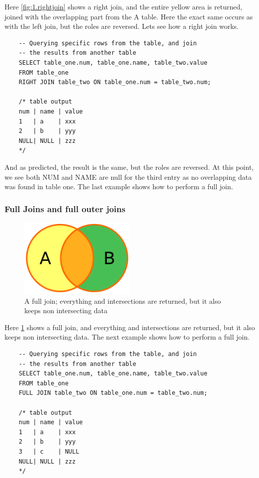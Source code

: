 Here \cref{fig:1.rightjoin} shows a right join, and the entire yellow area is returned, joined with the overlapping part from the A table. Here the exact same occurs as with the left join, but the roles are reversed. Lets see how a right join works.

\begin{verbatim}
    -- Querying specific rows from the table, and join 
    -- the results from another table
    SELECT table_one.num, table_one.name, table_two.value
    FROM table_one
    RIGHT JOIN table_two ON table_one.num = table_two.num;

    /* table output
    num | name | value
    1   | a    | xxx
    2   | b    | yyy
    NULL| NULL | zzz
    */
\end{verbatim}

And as predicted, the result is the same, but the roles are reversed. At this point, we see both NUM and NAME are null for the third entry as no overlapping data was found in table one. The last example shows how to perform a full join.

\subsubsection{Full Joins and full outer joins}

\begin{figure}[H]
    \centering
    \includegraphics[width=0.5\textwidth]{content/1-relational-databases/figures/joins/fulljoin.png}
    \caption{A full join; everything and intersections are returned, but it also keeps non intersecting data}
    \label{fig:1.fulljoin}
\end{figure}

Here \cref{fig:1.fulljoin} shows a full join, and everything and intersections are returned, but it also keeps non intersecting data. The next example shows how to perform a full join.

\begin{verbatim}
    -- Querying specific rows from the table, and join 
    -- the results from another table
    SELECT table_one.num, table_one.name, table_two.value
    FROM table_one
    FULL JOIN table_two ON table_one.num = table_two.num;

    /* table output
    num | name | value
    1   | a    | xxx
    2   | b    | yyy
    3   | c    | NULL
    NULL| NULL | zzz
    */
\end{verbatim}

